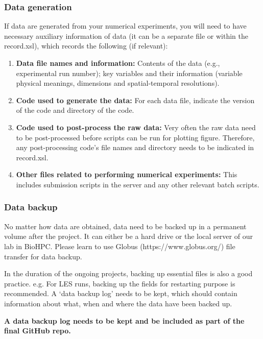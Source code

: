\documentclass[12pt]{article}
\begin{document}
\subsubsection{Data generation}
If data are generated from your numerical experiments, you will need to have necessary auxiliary information of data (it can be a separate file or within the record.xsl), which records the following (if relevant):
\begin{enumerate}
    \item \textbf{Data file names and information:} Contents of the data (e.g., experimental run number); key variables and their information (variable physical meanings, dimensions and spatial-temporal resolutions).
    \item \textbf{Code used to generate the data:} For each data file, indicate the version of the code and directory of the code. 
    \item \textbf{Code used to post-process the raw data:} Very often the raw data need to be post-processed before scripts can be run for plotting figure. Therefore, any post-processing code's file names and directory needs to be indicated in record.xsl. 
    \item \textbf{Other files related to performing numerical experiments:} This includes submission scripts in the server and any other relevant batch scripts. 
    
\end{enumerate}

\subsubsection{Data backup}
No matter how data are obtained, data need to be backed up in a permanent volume after the project. It can either be a hard drive or the local server of our lab in BioHPC. Please learn to use Globus (https://www.globus.org/) file transfer for data backup. 

In the duration of the ongoing projects, backing up essential files is also a good practice. e.g. For LES runs, backing up the fields for restarting purpose is recommended. A `data backup log' needs to be kept, which should contain information about what, when and where the data have been backed up.

\large\textbf{A data backup log needs to be kept and be included as part of the final GitHub repo.}

\pagebreak

\printbibliography %
\end{document}
